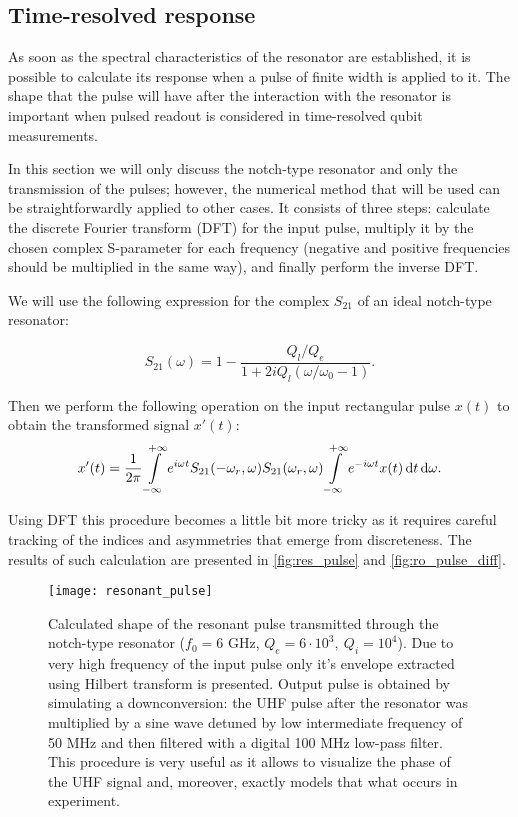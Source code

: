 \subsection{Time-resolved response}

As soon as the spectral characteristics of the resonator are established, it is possible to calculate its response when a pulse of finite width is applied to it. The shape that the pulse will have after the interaction with the resonator is important when pulsed readout is considered in time-resolved qubit measurements. 

In this section we will only discuss the notch-type resonator and only the transmission of the pulses; however, the numerical method that will be used can be straightforwardly applied to other cases. It consists of three steps: calculate the discrete Fourier transform (DFT) for the input pulse, multiply it by the chosen complex S-parameter for each frequency (negative and positive frequencies should be multiplied in the same way), and finally perform the inverse DFT. 

We will use the following expression for the complex $S_{21}$ of an ideal notch-type resonator\cite{probst2015}:

\[
S_{21} (\omega)= 1 - \frac{Q_l/Q_e}{1 + 2 i Q_l (\omega/\omega_0 - 1)}.
\]

Then we perform the following operation on the input rectangular pulse $x(t)$ to obtain the transformed signal $x'(t)$:
\[
x'(t) = \frac{1}{2\pi}\int\limits_{-\infty}^{+\infty} e^{i\omega t} {S_{21}(-\omega_r, \omega)}S_{21}(\omega_r, \omega)\int\limits_{-\infty}^{+\infty} e^{-i\omega t}x(t) \,\mathrm{d} t \,\mathrm{d} \omega.
\]

Using DFT this procedure becomes a little bit more tricky as it requires careful tracking of the indices and asymmetries that emerge from discreteness. The results of such calculation are presented in \autoref{fig:res_pulse} and \autoref{fig:ro_pulse_diff}. 


\begin{figure}
\texttt{[image: resonant\_pulse]}
\caption{Calculated shape of the resonant pulse transmitted through the notch-type resonator ($f_0 = 6$ GHz, $Q_e=6 \cdot 10^3,\ Q_i = 10^4$). Due to very high frequency of the input pulse only it's envelope extracted using Hilbert transform is presented. Output pulse is obtained by simulating a downconversion: the UHF pulse after the resonator was multiplied by a sine wave detuned by low intermediate frequency of 50 MHz and then filtered with a digital 100 MHz low-pass filter. This procedure is very useful as it allows to visualize the phase of the UHF signal and, moreover, exactly models that what occurs in experiment.}
\label{fig:res_pulse}
\end{figure}

